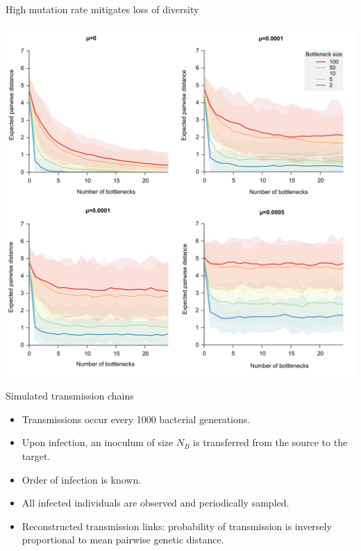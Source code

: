 \documentclass{beamer}
\begin{document}
\begin{frame}{High mutation rate mitigates loss of diversity}
    \vspace{-0.5cm}
    \begin{center}
        \includegraphics[scale=0.3]{fs4}
    \end{center}
\end{frame}

\begin{frame}{Simulated transmission chains}
    \begin{itemize}
        \setlength{\itemsep}{10pt}
        \item Transmissions occur every 1000 bacterial generations.
        \item Upon infection, an inoculum of size $N_B$ is transferred from the
            source to the target.
        \item Order of infection is known.
        \item All infected individuals are observed and periodically sampled.
        \item Reconstructed transmission links: probability of transmission is
            inversely proportional to mean pairwise genetic distance.
    \end{itemize}
\end{frame}
\end{document}
